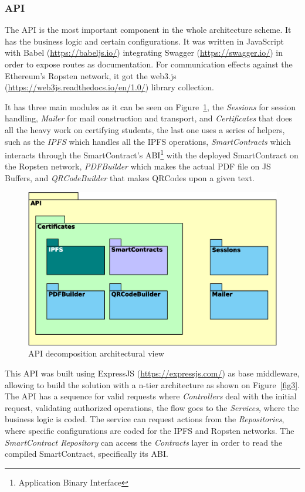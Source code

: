 \documentclass[runningheads]{llncs}
\begin{document}
\subsubsection{API}
The API is the most important component in the whole architecture scheme. It has the business logic and certain configurations. It was written in JavaScript with Babel (\url{https://babeljs.io/}) integrating Swagger (\url{https://swagger.io/}) in order to expose routes as documentation. For communication effects against the Ethereum's Ropsten network, it got the web3.js (\url{https://web3js.readthedocs.io/en/1.0/}) library collection.

It has three main modules as it can be seen on Figure~\ref{fig2}, the \emph{Sessions} for session handling, \emph{Mailer} for mail construction and transport, and \emph{Certificates} that does all the heavy work on certifying students, the last one uses a series of helpers, such as the \emph{IPFS} which handles all the IPFS operations, \emph{SmartContracts} which interacts through the SmartContract's ABI\footnote{Application Binary Interface} with the deployed SmartContract on the Ropsten network, \emph{PDFBuilder} which makes the actual PDF file on JS Buffers, and \emph{QRCodeBuilder} that makes QRCodes upon a given text.

\begin{figure}
\includegraphics[width=\textwidth]{02-API-Decomposition.eps}
\caption{API decomposition architectural view}
\label{fig2}
\end{figure}

This API was built using ExpressJS (\url{https://expressjs.com/}) as base middleware, allowing to build the solution with a n-tier architecture as shown on Figure~\ref{fig3}. The API has a sequence for valid requests where \emph{Controllers} deal with the initial request, validating authorized operations, the flow goes to the \emph{Services}, where the business logic is coded. The service can request actions from the \emph{Repositories}, where specific configurations are coded for the IPFS and Ropsten networks. The \emph{SmartContract Repository} can access the \emph{Contracts} layer in order to read the compiled SmartContract, specifically its ABI.
\end{document}
